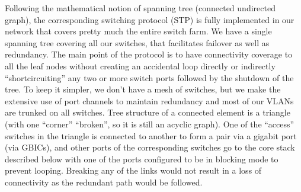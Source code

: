 Following the mathematical notion of spanning tree (connected undirected graph), the
corresponding switching protocol \cite{perlman-spanning-tree-1985,wiki:spanning-tree-protocol,cisco-kb-stp}
(STP) is fully implemented
in our network that covers pretty much the entire
switch farm.
We have a single spanning tree covering all our switches,
that facilitates failover as well as redundancy.
The main point of the protocol is to have connectivity coverage
to all the leaf nodes without creating an accidental loop directly
or indirectly ``shortcircuiting'' any two or more switch ports
followed by the shutdown of the tree. To keep it simpler, we don't have a mesh of switches,
but we make the extensive use of port channels to maintain
redundancy and most of our VLANs are trunked on all switches.
Tree structure of a connected element is a triangle (with one
``corner'' ``broken'', so it is still an acyclic graph).
One of the ``access'' switches in the triangle is connected to another to form a pair
via a gigabit port (via GBICs), and other ports of the corresponding switches
go to the core stack described below with one of the ports configured
to be in blocking mode to prevent looping. Breaking any of the links would
not result in a loss of connectivity as the redundant path would be followed.

